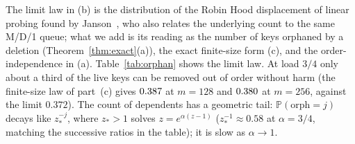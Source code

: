 \documentclass[11pt,a4paper]{article}
\theoremstyle{definition}
\theoremstyle{remark}
\newcommand{\Prob}{\mathbb{P}}
\begin{document}
The limit law in (b) is the distribution of the Robin Hood displacement of linear probing found by Janson~\cite[Thm.~8.1, Eq.~(8.4)]{janson2005}, who also relates the underlying count to the same M/D/1 queue; what we add is its reading as the number of keys orphaned by a deletion (Theorem~\ref{thm:exact}(a)), the exact finite-size form (c), and the order-independence in (a). Table~\ref{tab:orphan} shows the limit law. At load $3/4$ only about a third of the live keys can be removed out of order without harm (the finite-size law of part~(c) gives $0.387$ at $m=128$ and $0.380$ at $m=256$, against the limit $0.372$). The count of dependents has a geometric tail: $\Prob(\mathrm{orph}=j)$ decays like $z_*^{-j}$, where $z_*>1$ solves $z=e^{\alpha(z-1)}$ ($z_*^{-1}\approx0.58$ at $\alpha=3/4$, matching the successive ratios in the table); it is slow as $\alpha\to1$.
\end{document}
